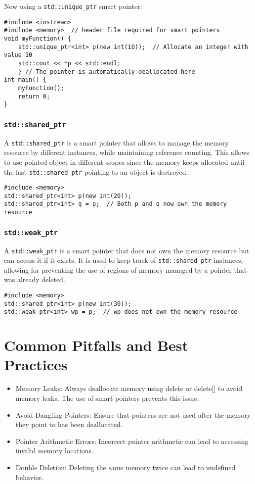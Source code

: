 \documentclass{article}
\begin{document}
Now using a \verb+std::unique_ptr+ smart pointer:

\begin{verbatim}
#include <iostream>
#include <memory>  // header file required for smart pointers
void myFunction() {
    std::unique_ptr<int> p(new int(10));  // Allocate an integer with value 10
    std::cout << *p << std::endl;
    } // The pointer is automatically deallocated here
int main() {
    myFunction();
    return 0;
}
\end{verbatim}


\cprotect\subsubsection{\verb|std::shared_ptr|}

A \verb|std::shared_ptr| is a smart pointer that allows to manage the memory resource by different instances, while maintaining reference counting. This allows to use pointed object in different scopes since the memory keeps allocated until the last \verb|std::shared_ptr| pointing to an object is destroyed.

\begin{verbatim}
#include <memory>
std::shared_ptr<int> p(new int(20));
std::shared_ptr<int> q = p;  // Both p and q now own the memory resource
\end{verbatim}

\cprotect\subsubsection{\verb+std::weak_ptr+}
A \verb|std::weak_ptr| is a smart pointer that does not own the memory resource but can access it if it exists. It is used to keep track of \verb|std::shared_ptr| instances, allowing for preventing the use of regions of memory managed by a pointer that was already deleted.

\begin{verbatim}
#include <memory>
std::shared_ptr<int> p(new int(30));
std::weak_ptr<int> wp = p;  // wp does not own the memory resource
\end{verbatim}


\section{Common Pitfalls and Best Practices}
\begin{itemize}
    \item Memory Leaks: Always deallocate memory using delete or delete[] to avoid memory leaks. The use of smart pointers prevents this issue.
    \item Avoid Dangling Pointers: Ensure that pointers are not used after the memory they point to has been deallocated.
    \item Pointer Arithmetic Errors: Incorrect pointer arithmetic can lead to accessing invalid memory locations.
    \item Double Deletion: Deleting the same memory twice can lead to undefined behavior.
\end{itemize}
\end{document}
